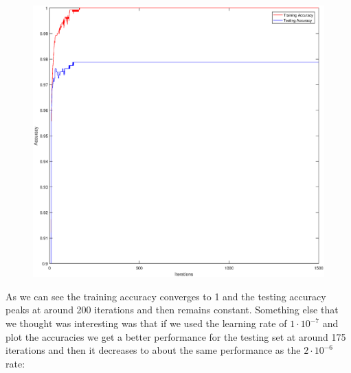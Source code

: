 \documentclass{article}
\begin{document}
	\begin{figure}[h!]
		\begin{center} 
			\includegraphics[scale=0.4]{iter_accuracy.eps} 
		\end{center}  
		\label{fig:M3}
	\end{figure}

As we can see the training accuracy converges to 1 and the testing accuracy peaks at around 200 iterations and then remains constant. Something else that we thought was interesting was that if we used the learning rate of $1 \cdot 10^{-7}$ and plot the accuracies we get a better performance for the testing set at around 175 iterations and then it decreases to about the same performance as the $2 \cdot 10^{-6}$ rate:

\newpage
\end{document}
